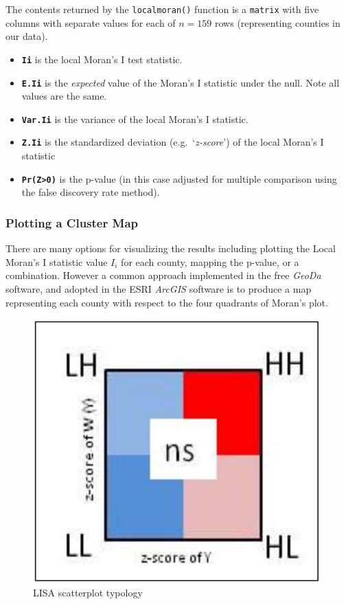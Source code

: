 \documentclass[
]{book}
\newcommand{\passthrough}[1]{#1}
\providecommand{\tightlist}{%
  \setlength{\itemsep}{0pt}\setlength{\parskip}{0pt}}
\begin{document}
The contents returned by the \passthrough{\lstinline!localmoran()!} function is a \passthrough{\lstinline!matrix!} with five columns with separate values for each of \(n=159\) rows (representing counties in our data).

\begin{itemize}
\tightlist
\item
  \textbf{\passthrough{\lstinline!Ii!}} is the local Moran's I test statistic.\\
\item
  \textbf{\passthrough{\lstinline!E.Ii!}} is the \emph{expected} value of the Moran's I statistic under the null. Note all values are the same.
\item
  \textbf{\passthrough{\lstinline!Var.Ii!}} is the variance of the local Moran's I statistic.
\item
  \textbf{\passthrough{\lstinline!Z.Ii!}} is the standardized deviation (e.g.~`\emph{z-score}') of the local Moran's I statistic
\item
  \textbf{\passthrough{\lstinline!Pr(Z>0)!}} is the p-value (in this case adjusted for multiple comparison using the false discovery rate method).
\end{itemize}

\hypertarget{plotting-a-cluster-map}{%
\subsubsection{Plotting a Cluster Map}\label{plotting-a-cluster-map}}

There are many options for visualizing the results including plotting the Local Moran's I statistic value \(I_i\) for each county, mapping the p-value, or a combination. However a common approach implemented in the free \emph{GeoDa} software, and adopted in the ESRI \emph{ArcGIS} software is to produce a map representing each county with respect to the four quadrants of Moran's plot.

\begin{figure}
\centering
\includegraphics{images/lisa-typology.jpg}
\caption{\label{fig:unnamed-chunk-216}LISA scatterplot typology}
\end{figure}
\end{document}
